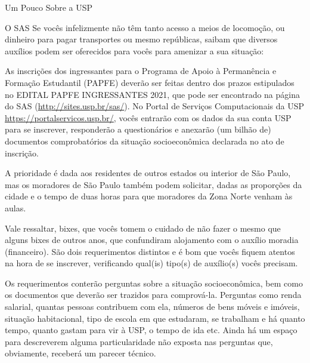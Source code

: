\begin{secao}{Um Pouco Sobre a USP}
\begin{subsecao}{O SAS}
Se vocês infelizmente não têm tanto acesso a meios de locomoção, ou dinheiro para
pagar transportes ou mesmo repúblicas, saibam que diversos auxílios podem ser
oferecidos para vocês para amenizar a sua situação:



As inscrições dos ingressantes para o Programa de Apoio à Permanência e Formação Estudantil (PAPFE)
deverão ser feitas dentro dos prazos estipulados no EDITAL PAPFE INGRESSANTES 2021, que pode 
ser encontrado na página do SAS (\url{http://sites.usp.br/sas/}). No 
Portal de Serviços Computacionais da USP \url{https://portalservicos.usp.br/}, vocês entrarão 
com os dados da sua conta USP para se inscrever, responderão a questionários e anexarão (um bilhão de) 
documentos comprobatórios da situação socioeconômica declarada no ato de inscrição.

A prioridade é dada aos residentes de outros estados ou interior de São Paulo,
mas os moradores de São Paulo também podem solicitar, dadas as proporções da
cidade e o tempo de duas horas para que moradores da Zona Norte venham às aulas.

Vale ressaltar, bixes, que vocês tomem o cuidado de não fazer o mesmo que alguns
bixes de outros anos, que confundiram alojamento com o auxílio moradia (financeiro). São dois
requerimentos distintos e é bom que vocês fiquem atentos na hora de se inscrever, verificando
qual(is) tipo(s) de auxílio(s) vocês precisam.

Os requerimentos conterão perguntas sobre a situação socioeconômica, bem como os
documentos que deverão ser trazidos para comprová-la. Perguntas como renda
salarial, quantas pessoas contribuem com ela, números de bens móveis e imóveis,
situação habitacional, tipo de escola em que estudaram, se trabalham e há quanto
tempo, quanto gastam para vir à USP, o tempo de ida etc. Ainda há um espaço
para descreverem alguma particularidade não exposta nas perguntas que, obviamente,
receberá um parecer técnico.


\end{subsecao}
\end{secao}
